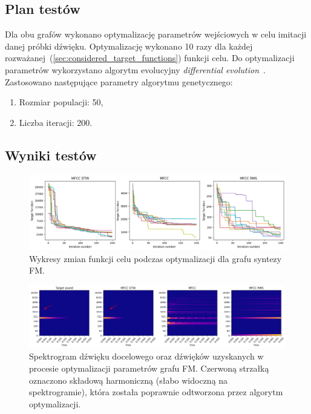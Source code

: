 \subsection{Plan testów}

Dla obu grafów wykonano optymalizację parametrów wejściowych w celu imitacji danej
próbki dźwięku. Optymalizację wykonano 10 razy dla każdej rozważanej~(\ref{sec:considered_target_functions})
funkcji celu. Do optymalizacji parametrów wykorzystano algorytm evolucyjny
\textit{differential evolution}~\cite{2020SciPy-NMeth}. 
Zastosowano następujące parametry algorytmu genetycznego:

\begin{enumerate}
  \item Rozmiar populacji: 50,
  \item Liczba iteracji: 200.
\end{enumerate}


\subsection{Wyniki testów}

\begin{figure}[H]
    \centering
    \includegraphics[width=1.0\linewidth]{rys03/target_functions_progress.png}
    \caption{
      Wykresy zmian funkcji celu podczas optymalizacji dla grafu syntezy FM\@.
    }\label{fig:param_optimisation_results_target_fun_plots}
\end{figure}

\begin{figure}[H]
    \centering
    \includegraphics[width=1.0\linewidth]{rys03/spectro_results_fm.png}
    \caption{
      Spektrogram dźwięku docelowego oraz dźwięków uzyskanych w procesie optymalizacji parametrów grafu FM\@.
      Czerwoną strzałką oznaczono składową harmoniczną (słabo widoczną na spektrogramie),
      która została poprawnie odtworzona przez algorytm optymalizacji.
    }\label{fig:param_optimisation_results_spectrograms}
\end{figure}

